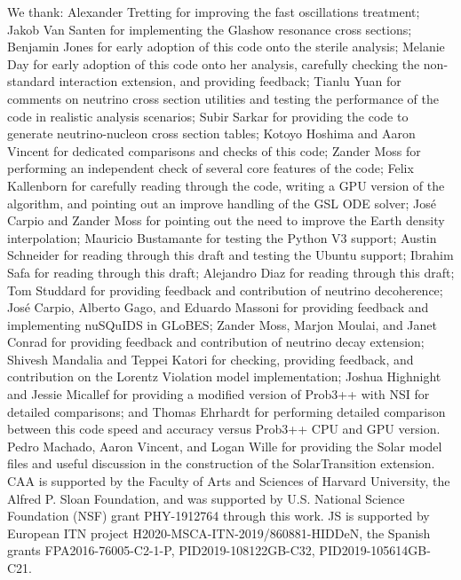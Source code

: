 \documentclass[3p,12pt]{elsarticle}
\begin{document}
We thank: Alexander Tretting for improving the fast oscillations treatment;
Jakob Van Santen for implementing the Glashow resonance cross sections;
Benjamin Jones for early adoption of this code onto the sterile analysis;
Melanie Day for early adoption of this code onto her analysis, carefully checking the non-standard interaction extension, and providing feedback;
Tianlu Yuan for comments on neutrino cross section utilities and testing the performance of the code in realistic analysis scenarios;
Subir Sarkar for providing the code to generate neutrino-nucleon cross section tables;
Kotoyo Hoshima and Aaron Vincent for dedicated comparisons and checks of this code;
Zander Moss for performing an independent check of several core features of the code;
Felix Kallenborn for carefully reading through the code, writing a GPU version of the algorithm, and pointing out an improve handling of the GSL ODE solver;
Jos\'e Carpio and Zander Moss for pointing out the need to improve the Earth density interpolation;
Mauricio Bustamante for testing the Python V3 support;
Austin Schneider for reading through this draft and testing the Ubuntu support;
Ibrahim Safa for reading through this draft;
Alejandro Diaz for reading through this draft;
Tom Studdard for providing feedback and contribution of neutrino decoherence;
Jos\'e Carpio, Alberto Gago, and Eduardo Massoni for providing feedback and implementing nuSQuIDS in GLoBES;
Zander Moss, Marjon Moulai, and Janet Conrad for providing feedback and contribution of neutrino decay extension;
Shivesh Mandalia and Teppei Katori for checking, providing feedback, and contribution on the Lorentz Violation model implementation;
Joshua Highnight and Jessie Micallef for providing a modified version of Prob3++ with NSI for detailed comparisons; and
Thomas Ehrhardt for performing detailed comparison between this code speed and accuracy versus Prob3++ CPU and GPU version.
Pedro Machado, Aaron Vincent, and Logan Wille for providing the Solar model files and useful discussion in the construction of the SolarTransition extension.
CAA is supported by the Faculty of Arts and Sciences of Harvard University, the Alfred P. Sloan Foundation, and was supported by U.S. National Science Foundation (NSF) grant PHY-1912764 through this work.
JS is supported by  European ITN project H2020-MSCA-ITN-2019/860881-HIDDeN, the Spanish grants FPA2016-76005-C2-1-P, 
PID2019-108122GB-C32, PID2019-105614GB-C21.


\ifdefined\forjournal

\else

\fi %
\fi %
\end{document}

